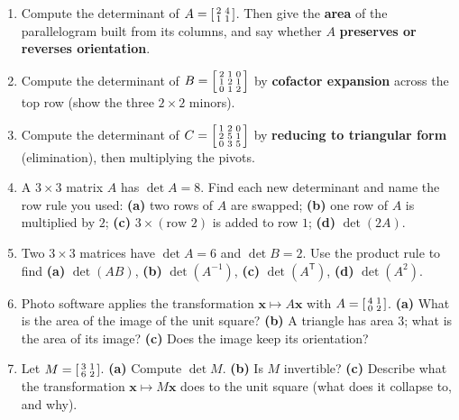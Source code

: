\documentclass[10pt]{article}
\newcommand{\xx}{\mathbf{x}}
\newcommand{\T}{^{\mathsf T}}
\begin{document}
\begin{enumerate}[leftmargin=1.9em, itemsep=12pt]
  \item Compute the determinant of $A=\begin{bsmallmatrix}2&4\\1&1\end{bsmallmatrix}$. Then give the
        \textbf{area} of the parallelogram built from its columns, and say whether $A$
        \textbf{preserves or reverses orientation}.
        \vspace{1.8cm}
  \item Compute the determinant of $B=\begin{bsmallmatrix}2&1&0\\1&2&1\\0&1&2\end{bsmallmatrix}$ by
        \textbf{cofactor expansion} across the top row (show the three $2\times2$ minors).
        \vspace{2.6cm}
  \item Compute the determinant of $C=\begin{bsmallmatrix}1&2&0\\2&5&1\\0&3&5\end{bsmallmatrix}$ by
        \textbf{reducing to triangular form} (elimination), then multiplying the pivots.
        \vspace{2.8cm}
  \item A $3\times3$ matrix $A$ has $\det A=8$. Find each new determinant and name the row rule you used:
        \textbf{(a)} two rows of $A$ are swapped; \textbf{(b)} one row of $A$ is multiplied by $2$;
        \textbf{(c)} $3\times(\text{row }2)$ is added to row $1$; \textbf{(d)} $\det(2A)$.
        \vspace{2.6cm}
  \item Two $3\times3$ matrices have $\det A=6$ and $\det B=2$. Use the product rule to find
        \textbf{(a)} $\det(AB)$, \textbf{(b)} $\det(A^{-1})$, \textbf{(c)} $\det(A\T)$, \textbf{(d)} $\det(A^2)$.
        \vspace{2.4cm}
  \item Photo software applies the transformation $\xx\mapsto A\xx$ with $A=\begin{bsmallmatrix}4&1\\0&2\end{bsmallmatrix}$.
        \textbf{(a)} What is the area of the image of the unit square? \textbf{(b)} A triangle has area $3$;
        what is the area of its image? \textbf{(c)} Does the image keep its orientation?
        \vspace{2.4cm}
  \item Let $M=\begin{bsmallmatrix}3&1\\6&2\end{bsmallmatrix}$. \textbf{(a)} Compute $\det M$.
        \textbf{(b)} Is $M$ invertible? \textbf{(c)} Describe what the transformation $\xx\mapsto M\xx$ does
        to the unit square (what does it collapse to, and why).
        \vspace{2.4cm}
\end{enumerate}
\end{document}
